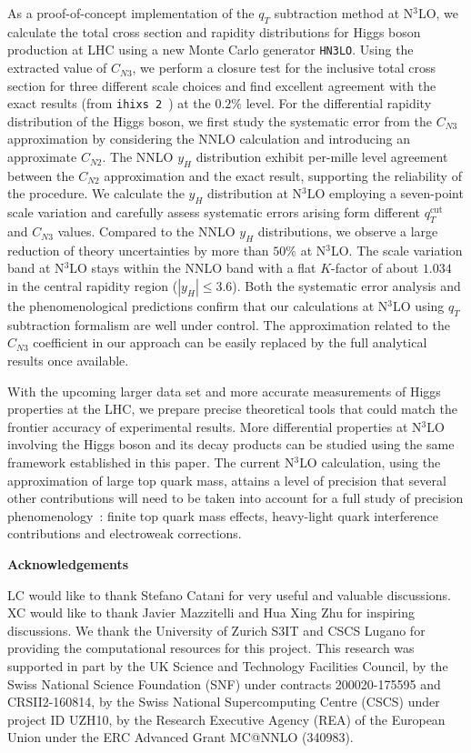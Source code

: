 \documentclass[12pt]{article}
\DeclareRobustCommand{\qt}{q_T}
\DeclareRobustCommand{\qtcut}{\ensuremath{q_T^\mathrm{cut}}}
\begin{document}
As a proof-of-concept implementation of the $\qt$ subtraction method at N$^3$LO,  we calculate the total cross section and rapidity distributions for Higgs boson production at LHC using a new Monte Carlo generator \texttt{HN3LO}. Using the extracted value of $C_{N3}$, we perform a closure test for the inclusive total cross section for three different scale choices and find excellent agreement with the exact results (from \texttt{ihixs 2}~\cite{Dulat:2018rbf}) at the $0.2\%$ level. For the differential rapidity distribution of the Higgs boson, we first study the systematic error from the $C_{N3}$ approximation by considering the NNLO calculation and introducing an approximate $C_{N2}$. The NNLO $y_H$ distribution exhibit per-mille level agreement between the $C_{N2}$ approximation and the exact result, supporting the reliability of the procedure. 
We calculate the $y_H$ distribution at N$^3$LO employing a seven-point scale variation and carefully assess systematic errors arising form different $\qtcut$ and $C_{N3}$ values. Compared to the NNLO $y_H$ distributions, we observe a large reduction of theory uncertainties by more than $50\%$ at N$^3$LO. The scale variation band at N$^3$LO stays within the NNLO band with a flat $K$-factor of about $1.034$ in the central rapidity region ($|y_H|\leq3.6$). Both the systematic error analysis and the phenomenological predictions confirm that our calculations at N$^3$LO using $\qt$ subtraction formalism are well under control. The approximation related to the $C_{N3}$ coefficient in our approach can be easily replaced by the full analytical results once available. 

With the upcoming larger data set and more accurate measurements of Higgs properties at the LHC, we prepare precise theoretical tools that could match the frontier accuracy of experimental results. More differential properties at N$^3$LO involving the Higgs boson and its decay products can be studied using the same framework established in this paper. The current N$^3$LO calculation, using the approximation of large top quark mass, attains a level of  precision that several 
other contributions will need to be taken into account for a full study of precision phenomenology~\cite{Anastasiou:2016cez}: finite top quark mass effects, heavy-light quark interference contributions  
and electroweak corrections. 


\bigskip\noindent\textbf{Acknowledgements}

LC would like to thank Stefano Catani for very useful and valuable discussions. XC would like to thank Javier Mazzitelli and Hua Xing Zhu for inspiring discussions. We thank the University of Zurich S3IT and CSCS Lugano for providing the computational resources for this project. This research was supported in part by the UK Science and Technology Facilities Council, by the Swiss National Science Foundation (SNF) under contracts 200020-175595 and CRSII2-160814, by the Swiss National Supercomputing Centre (CSCS) under project ID UZH10, by the Research Executive Agency (REA) of the European Union under the ERC Advanced Grant MC@NNLO (340983).
\end{document}
